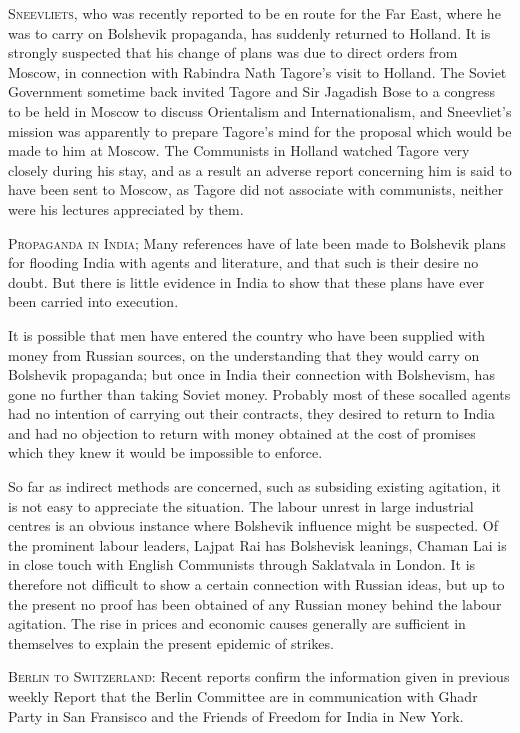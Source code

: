 \textsc{Sneevliets,} who was recently reported to be en route for the Far East, where he was to carry on Bolshevik propaganda, has suddenly returned to Holland. It is strongly suspected 
that his change of plans was due to direct orders from Moscow, in connection with Rabindra Nath Tagore’s visit to Holland. The Soviet Government sometime back invited Tagore and 
Sir Jagadish Bose to a congress to be held in Moscow to discuss Orientalism and Internationalism, and Sneevliet’s mission was apparently to prepare Tagore’s mind for the proposal which would be made to him at Moscow. The Communists in Holland watched Tagore very closely during his stay, and as a result an adverse report concerning him is said to have been sent to Moscow, as Tagore did not associate with communists, neither were his lectures appreciated by them. 

\textsc{Propaganda in India;} Many references have of late been made to Bolshevik plans for flooding India with agents and literature, and that such is their desire no doubt. But there is little evidence in India to show that these plans have ever been carried into execution. 

It is possible that men have entered the country who have been supplied with money from Russian sources, on the understanding that they would carry on Bolshevik propaganda; but once in India their connection with Bolshevism, has gone no further than taking Soviet money. Probably most of these socalled agents had no intention of carrying out their contracts, they desired to return to India and had no objection to return with money obtained at the cost of promises which they knew it would be impossible to enforce. 

So far as indirect methods are concerned, such as subsiding existing agitation, it is not easy to appreciate the situation. The labour unrest in large industrial centres is an obvious instance where Bolshevik influence might be suspected. Of the prominent labour leaders, Lajpat Rai has Bolshevisk leanings, Chaman Lai is in close touch with English Communists through Saklatvala in London. It is therefore not difficult to show a certain connection with Russian ideas, but up to the present no proof has been obtained of any Russian money behind the labour agitation. The rise in prices and economic causes generally are sufficient in themselves to explain the present epidemic of strikes. 


\textsc{Berlin to Switzerland:} Recent reports confirm the information given in previous weekly Report that the Berlin Committee are in communication with Ghadr Party in San Fransisco and the Friends of Freedom for India in New York. 

